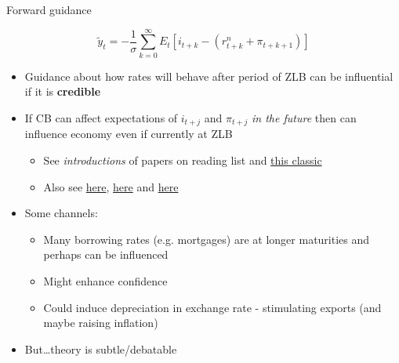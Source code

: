 \begin{frame}{Forward guidance}

\begin{equation*}
\tilde{y}_{t} = -\frac{1}{\sigma} \sum\limits_{k=0}^{\infty} E_{t}[ i_{t+k} -  (r^{n}_{t+k} + \pi_{t+k+1}) ]
\end{equation*}
\begin{itemize}
\item	Guidance about how rates will behave after period of ZLB can be influential if it is \textbf{credible}
\item	If CB can affect expectations of $i_{t+j}$ and $\pi_{t+j}$ \emph{in the future} then can influence economy even if currently at ZLB
	\begin{itemize}
	\item	See \textit{introductions} of papers on reading list and \href{https://www.frbsf.org/economic-research/files/SecretsShort-NBER-ch6-2008.pdf}{this classic}
	\item	Also see \href{https://uk.reuters.com/article/us-usa-fed-williams/feds-williams-makes-case-for-lower-for-longer-rates-idUKKCN1S91OE}{here}, \href{https://www.newyorkfed.org/newsevents/speeches/2019/wil190718}{here} and \href{https://www.brookings.edu/blog/up-front/2018/09/14/comments-on-monetary-policy-at-the-effective-lower-bound/}{here}
	\end{itemize}
\item	Some channels:
	\begin{itemize}
	\item	Many borrowing rates (e.g. mortgages) are at longer maturities and perhaps can be influenced
	\item	Might enhance confidence
	\item	Could induce depreciation in exchange rate - stimulating exports (and maybe raising inflation)
	\end{itemize}
\item	But\ldots theory is subtle/debatable
\end{itemize}

\end{frame}


	
